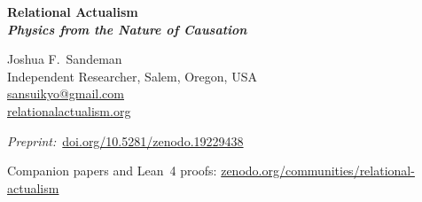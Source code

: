 \documentclass[11pt,a4paper]{article}
\begin{document}
\begin{titlepage}
\centering
\vspace*{1.5cm}

{\LARGE\bfseries Relational Actualism\\[0.5em]
\large\itshape Physics from the Nature of Causation\par}

\vspace{1.4cm}

{\large Joshua F.\ Sandeman\\[0.3em]
\normalsize Independent Researcher, Salem, Oregon, USA\\[0.2em]
\href{mailto:sansuikyo@gmail.com}{sansuikyo@gmail.com}\\[0.4em]
\href{https://relationalactualism.org}{relationalactualism.org}}

\vspace{0.8cm}
{\small\textit{Preprint:}~\href{https://doi.org/10.5281/zenodo.19229438}{doi.org/10.5281/zenodo.19229438}\par}
  {\small Companion papers and Lean~4 proofs:
  \href{https://zenodo.org/communities/relational-actualism}%
  {zenodo.org/communities/relational-actualism}\par}

\vspace{1.4cm}


\end{titlepage}
\end{document}
